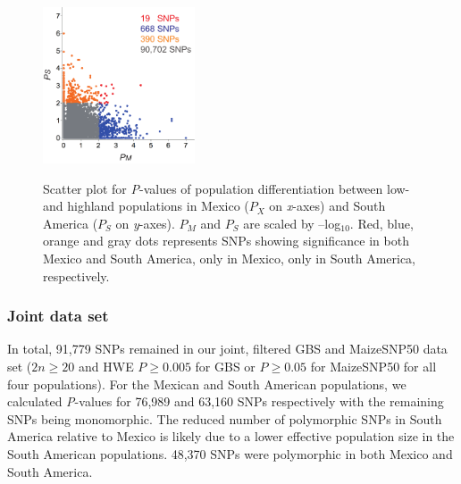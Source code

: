 \begin{figure}[tb]   
  \begin{center}
   \vspace{-0mm}
   \includegraphics[width=0.4\textwidth]{fig/Fig6}
   \renewcommand{\baselinestretch}{0.9}
   \vspace{-3mm}
   \caption{Scatter plot for \emph{P}-values of population differentiation between low- and highland populations in Mexico ($P_X$ on \emph{x}-axes) and South America ($P_S$ on \emph{y}-axes).  $P_M$ and $P_S$ are scaled by --log$_{10}$.  Red, blue, orange and gray dots represents SNPs showing significance in both Mexico and South America, only in Mexico, only in South America, respectively.} 
\vspace{-6mm}
    \label{PvDist}
  \end{center}
\end{figure}




\subsubsection{Joint data set}In total, 91,779 SNPs remained in our joint, filtered GBS and MaizeSNP50 data set ($2n\geq20$ and HWE $P\geq0.005$  for GBS or $P\geq0.05$ for MaizeSNP50 for all four populations).  For the Mexican and South American populations, we calculated \emph{P}-values for 76,989 and 63,160 SNPs respectively with the remaining SNPs being monomorphic. The reduced number of polymorphic SNPs in South America relative to Mexico is likely due to a lower effective population size in the South American populations.  48,370 SNPs were polymorphic in both Mexico and South America. 


